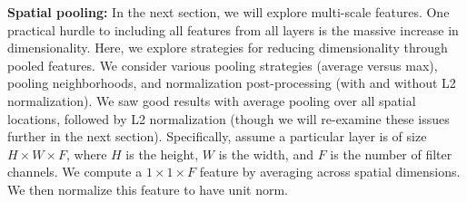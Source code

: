 \documentclass[10pt,twocolumn,letterpaper]{article}
\newcommand{\deva}[1]{\textcolor{blue}{[Deva: #1]}}
\newcommand{\songfan}[1]{\textcolor{blue}{[Songfan: #1]}}
\begin{document}
{\bf Spatial pooling:} In the next section, we will explore multi-scale features. One practical hurdle to including all features from all layers is the massive increase in dimensionality. Here, we explore strategies for reducing dimensionality through pooled features. We consider various pooling strategies (average versus max), pooling neighborhoods, and normalization post-processing (with and without L2 normalization). We saw good results with average pooling over all spatial locations, followed by L2 normalization (though we will re-examine these issues further in the next section). Specifically, assume a particular layer is of size $H \times W \times F$, where $H$ is the height, $W$ is the width, and $F$ is the number of filter channels. We compute a $1 \times 1 \times F$ feature by averaging across spatial dimensions. We then normalize this feature to have unit norm. %


\end{document}
